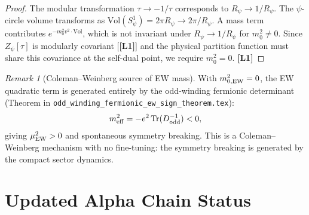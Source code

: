 \documentclass[12pt,a4paper]{article}
\theoremstyle{remark}\newtheorem{remark}[theorem]{Remark}
\newcommand{\Lo}{\textbf{[L1]}}
\begin{document}
\begin{proof}
The modular transformation $\tau\to -1/\tau$ corresponds to
$R_\psi\to 1/R_\psi$. The $\psi$-circle volume transforms as
$\mathrm{Vol}(S^1_\psi) = 2\pi R_\psi\to 2\pi/R_\psi$.
A mass term contributes $e^{-m^2_0 v^2\cdot\mathrm{Vol}}$, which is not
invariant under $R_\psi\to 1/R_\psi$ for $m^2_0\neq 0$.
Since $Z_\psi[\tau]$ is modularly covariant [\Lo] and the physical
partition function must share this covariance at the self-dual point,
we require $m^2_0=0$. \Lo
\end{proof}

\begin{remark}[Coleman--Weinberg source of EW mass]
With $m^2_{0,\rm EW}=0$, the EW quadratic term is generated entirely
by the odd-winding fermionic determinant
(Theorem in \texttt{odd\_winding\_fermionic\_ew\_sign\_theorem.tex}):
\[
  m^2_{\rm eff} = -e^2\,\mathrm{Tr}(D_{\rm odd}^{-1}) < 0,
\]
giving $\mu^2_{\rm EW} > 0$ and spontaneous symmetry breaking.
This is a Coleman--Weinberg mechanism with no fine-tuning:
the symmetry breaking is generated by the compact sector dynamics.
\end{remark}

\section{Updated Alpha Chain Status}
\label{sec:status}
\end{document}
